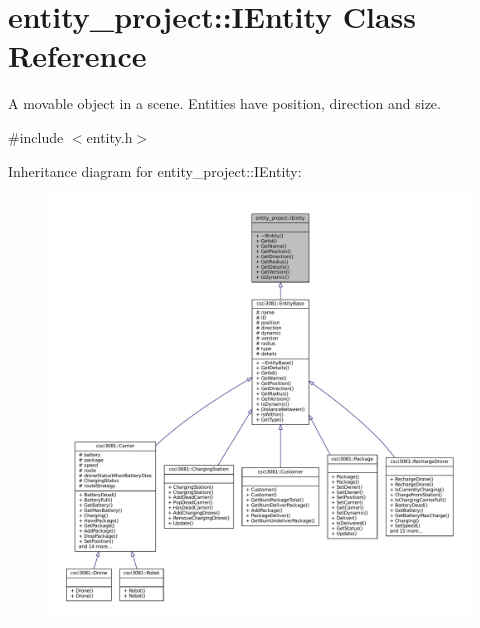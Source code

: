 \hypertarget{classentity__project_1_1IEntity}{}\section{entity\+\_\+project\+:\+:I\+Entity Class Reference}
\label{classentity__project_1_1IEntity}


A movable object in a scene. Entities have position, direction and size.  




{\ttfamily \#include $<$entity.\+h$>$}



Inheritance diagram for entity\+\_\+project\+:\+:I\+Entity\+:
\nopagebreak
\begin{figure}[H]
\begin{center}
\leavevmode
\includegraphics[width=350pt]{classentity__project_1_1IEntity__inherit__graph}
\end{center}
\end{figure}
